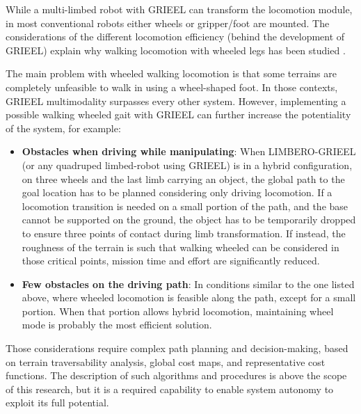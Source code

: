 While a multi-limbed robot with GRIEEL can transform the locomotion module, in most conventional robots either wheels or gripper/foot are mounted. The considerations of the different locomotion efficiency (behind the development of GRIEEL) explain why walking locomotion with wheeled legs has been studied \cite{AnymalDocThesis}\cite{WheelLegged}.

The main problem with wheeled walking locomotion is that some terrains are completely unfeasible to walk in using a wheel-shaped foot. In those contexts, GRIEEL multimodality surpasses every other system.
However, implementing a possible walking wheeled gait with GRIEEL can further increase the potentiality of the system, for example: 
\begin{itemize}
    \setlength\itemsep{-0.7em} 
    \item \textbf{Obstacles when driving while manipulating}: When LIMBERO-GRIEEL (or any quadruped limbed-robot using GRIEEL) is in a hybrid configuration, on three wheels and the last limb carrying an object, the global path to the goal location has to be planned considering only driving locomotion. If a locomotion transition is needed on a small portion of the path, and the base cannot be supported on the ground, the object has to be temporarily dropped to ensure three points of contact during limb transformation. If instead, the roughness of the terrain is such that walking wheeled can be considered in those critical points, mission time and effort are significantly reduced. 
    \item \textbf{Few obstacles on the driving path}: In conditions similar to the one listed above, where wheeled locomotion is feasible along the path, except for a small portion. When that portion allows hybrid locomotion, maintaining wheel mode is probably the most efficient solution.   
\end{itemize}

Those considerations require complex path planning and decision-making, based on terrain traversability analysis, global cost maps, and representative cost functions. The description of such algorithms and procedures is above the scope of this research, but it is a required capability to enable system autonomy to exploit its full potential.  

